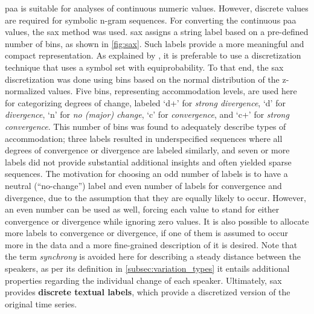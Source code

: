 \Ac{paa} is suitable for analyses of continuous numeric values.
However, discrete values are required for symbolic n-gram sequences.
For converting the continuous \ac{paa} values, the \acl{sax} \citep[\acs{sax};][]{Lin2007experiencing} method was used.
\Ac{sax} assigns a string label based on a pre-defined number of bins, as shown in \cref{fig:sax}.
Such labels provide a more meaningful and compact representation.
As explained by \citet{Apostolico2003monotony}, it is preferable to use a discretization technique that uses a symbol set with equiprobability.
To that end, the \ac{sax} discretization was done using bins based on the normal distribution of the z-normalized values.
Five bins, representing accommodation levels, are used here for categorizing degrees of change, labeled \enquote*{d+} for \emph{strong divergence}, \enquote*{d} for \emph{divergence}, \enquote*{n} for \emph{no (major) change}, \enquote*{c} for \emph{convergence}, and \enquote*{c+} for \emph{strong convergence}.
This number of bins was found to adequately describe types of accommodation;
three labels resulted in underspecified sequences where all degrees of convergence or divergence are labeled similarly, and seven or more labels did not provide substantial additional insights and often yielded sparse sequences.
The motivation for choosing an odd number of labels is to have a neutral (\enquote{no-change}) label and even number of labels for convergence and divergence, due to the assumption that they are equally likely to occur.
However, an even number can be used as well, forcing each value to stand for either convergence or divergence while ignoring zero values.
It is also possible to allocate more labels to convergence or divergence, if one of them is assumed to occur more in the data and a more fine-grained description of it is desired.
Note that the term \emph{synchrony} is avoided here for describing a steady distance between the speakers, as per its definition in \cref{subsec:variation_types} it entails additional properties regarding the individual change of each speaker.
Ultimately, \ac{sax} provides \textbf{discrete textual labels}, which provide a discretized version of the original time series.

